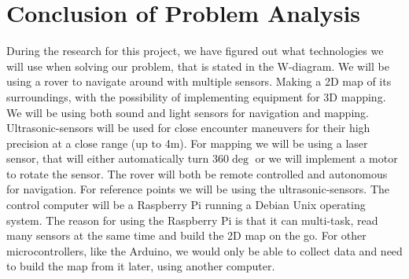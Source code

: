 \section{Conclusion of Problem Analysis}

During the research for this project, we have figured out what technologies we will use when solving our problem, that is stated in the W-diagram.
We will be using a rover to navigate around with multiple sensors. Making a 2D map of its surroundings, with the possibility of implementing equipment for 3D mapping. We will be using both sound and light sensors for navigation and mapping. Ultrasonic-sensors will be used for close encounter maneuvers for their high precision at a close range (up to 4m)\cite{ultra}. For mapping we will be using a laser sensor, that will either automatically turn 360$\deg$ or we will implement a motor to rotate the sensor.
The rover will both be remote controlled and autonomous for navigation. For reference points we will be using the ultrasonic-sensors. The control computer will be a Raspberry Pi running a Debian Unix operating system. The reason for using the Raspberry Pi is that it can multi-task, read many sensors at the same time and build the 2D map on the go. For other microcontrollers, like the Arduino, we would only be able to collect data and need to build the map from it later, using another computer.  


\clearpage
